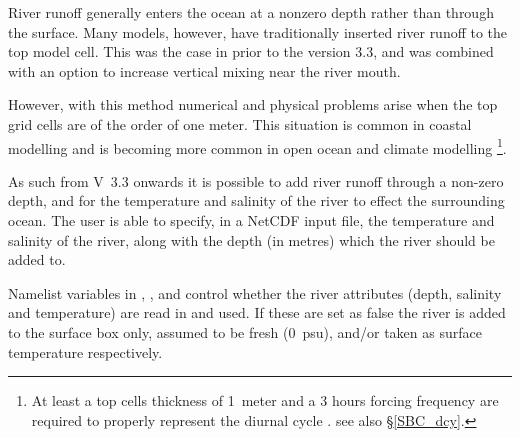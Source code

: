 \documentclass[NEMO_book]{subfiles}
\begin{document}




River runoff generally enters the ocean at a nonzero depth rather than through the surface.
Many models, however, have traditionally inserted river runoff to the top model cell.
This was the case in \NEMO prior to the version 3.3, and was combined with an option 
to increase vertical mixing near the river mouth.

However, with this method numerical and physical problems arise when the top grid cells are 
of the order of one meter. This situation is common in coastal modelling and is becoming 
more common in open ocean and climate modelling 
\footnote{At least a top cells thickness of 1~meter and a 3 hours forcing frequency are
required to properly represent the diurnal cycle \citep{Bernie_al_JC05}. see also \S\ref{SBC_dcy}.}.

As such from V~3.3 onwards it is possible to add river runoff through a non-zero depth, and for the 
temperature and salinity of the river to effect the surrounding ocean.
The user is able to specify, in a NetCDF input file, the temperature and salinity of the river, along with the   
depth (in metres) which the river should be added to.

Namelist variables in , ,  and  control whether 
the river attributes (depth, salinity and temperature) are read in and used.  If these are set 
as false the river is added to the surface box only, assumed to be fresh (0~psu), and/or 
taken as surface temperature respectively.
\end{document}
